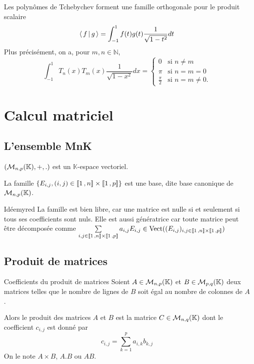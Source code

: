     \begin{prop}{}{}
        Les polynômes de Tchebychev forment une famille orthogonale pour le produit scalaire 
        \[ \left<\,f\,\middle|\,g\,\right> = \int_{-1}^{1} f(t)g(t) \frac{1}{\sqrt{1-t^2}} dt \]
        Plus précisément, on a, pour $m,n \in \mathbb{N}$,
       \[ \int_{-1}^1 T_n(x)T_m(x)\frac 1{\sqrt{1-x^2}}dx=
    \left\{
	\begin{array}{cl}
	0 &\text{si } n \neq m \\
	\pi &\text{si }n = m = 0 \\
	\frac{\pi}2 &\text{si } n = m \neq 0.
    \end{array}
    \right. \]
    \end{prop}

\newpage

\section{Calcul matriciel}

\subsection{L’ensemble MnK}

    \begin{theo}{}{}
        $(\mathcal{M}_{n,p}(\mathbb{K}),+,.)$ est un $\mathbb{K}$-espace vectoriel.
    \end{theo}

    \begin{theo}{}{}
        La famille $\{ E_{i,j}, (i,j) \in \left\llbracket 1 \, , n \right\rrbracket \times \left\llbracket 1 \, , p \right\rrbracket \}$ est une base, dite base canonique de $\mathcal{M}_{n,p}(\mathbb{K})$.
    \end{theo}

    \begin{demo}{Idée}{myred}
        La famille est bien libre, car une matrice est nulle si et seulement si tous ses coefficients sont nuls. Elle est aussi génératrice car toute matrice peut être décomposée comme $\sum\limits_{i,j \in \left\llbracket 1 \, , n \right\rrbracket \times \left\llbracket 1 \, , p \right\rrbracket} a_{i,j}E_{i,j} \in \operatorname{Vect}((E_{i,j})_{i,j \in \left\llbracket 1 \, , n \right\rrbracket \times \left\llbracket 1 \, , p \right\rrbracket})$
    \end{demo}

\subsection{Produit de matrices}

    \begin{defi}{Coefficients du produit de matrices}{}
        Soient $A \in \mathcal{M}_{n,p}(\mathbb{K})$ et $B \in \mathcal{M}_{p,q}(\mathbb{K})$ deux matrices telles que le nombre de lignes de $B$ soit égal au nombre de colonnes de $A$.

        Alors le produit des matrices $A$ et $B$ est la matrice $C \in \mathcal{M}_{n,q}(\mathbb{K})$ dont le coefficient $c_{i,j}$ est donné par 
        \[ c_{i,j} = \sum\limits_{k=1}^p a_{i,k} b_{k,j} \]
        On le note $A \times B$, $A.B$ ou $AB$.
    \end{defi}

